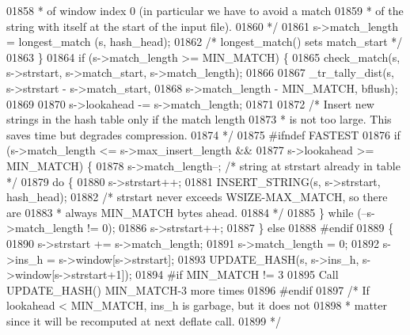 \begin{DoxyCode}
{{{{{01858 \textcolor{comment}{             * of window index 0 (in particular we have to avoid a match}
01859 \textcolor{comment}{             * of the string with itself at the start of the input file).}
01860 \textcolor{comment}{             */}
01861             s->match\_length = longest\_match (s, hash\_head);
01862             \textcolor{comment}{/* longest\_match() sets match\_start */}
01863         \}
01864         \textcolor{keywordflow}{if} (s->match\_length >= MIN\_MATCH) \{
01865             check\_match(s, s->strstart, s->match\_start, s->match\_length);
01866 
01867             \_tr\_tally\_dist(s, s->strstart - s->match\_start,
01868                            s->match\_length - MIN\_MATCH, bflush);
01869 
01870             s->lookahead -= s->match\_length;
01871 
01872             \textcolor{comment}{/* Insert new strings in the hash table only if the match length}
01873 \textcolor{comment}{             * is not too large. This saves time but degrades compression.}
01874 \textcolor{comment}{             */}
01875 \textcolor{preprocessor}{#ifndef FASTEST}
01876             \textcolor{keywordflow}{if} (s->match\_length <= s->max\_insert\_length &&
01877                 s->lookahead >= MIN\_MATCH) \{
01878                 s->match\_length--; \textcolor{comment}{/* string at strstart already in table */}
01879                 \textcolor{keywordflow}{do} \{
01880                     s->strstart++;
01881                     INSERT\_STRING(s, s->strstart, hash\_head);
01882                     \textcolor{comment}{/* strstart never exceeds WSIZE-MAX\_MATCH, so there are}
01883 \textcolor{comment}{                     * always MIN\_MATCH bytes ahead.}
01884 \textcolor{comment}{                     */}
01885                 \} \textcolor{keywordflow}{while} (--s->match\_length != 0);
01886                 s->strstart++;
01887             \} \textcolor{keywordflow}{else}
01888 \textcolor{preprocessor}{#endif}
01889             \{
01890                 s->strstart += s->match\_length;
01891                 s->match\_length = 0;
01892                 s->ins\_h = s->window[s->strstart];
01893                 UPDATE\_HASH(s, s->ins\_h, s->window[s->strstart+1]);
01894 \textcolor{preprocessor}{#if MIN\_MATCH != 3}
01895                 Call UPDATE\_HASH() MIN\_MATCH-3 more times
01896 \textcolor{preprocessor}{#endif}
01897                 \textcolor{comment}{/* If lookahead < MIN\_MATCH, ins\_h is garbage, but it does not}
01898 \textcolor{comment}{                 * matter since it will be recomputed at next deflate call.}
01899 \textcolor{comment}{                 */}
}}}}}
\end{DoxyCode}
